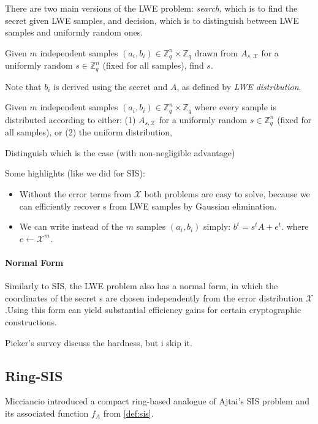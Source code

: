 There are two main versions of the LWE problem: \emph{search}, which is to find the secret given LWE samples,
and decision, which is to distinguish between LWE samples and uniformly random ones.

\label{def:LWE}
\begin{definition} 
    Given $m$ independent samples $(a_i,b_i) \in\mathbb{Z}_q^n \times \mathbb{Z}_q$ drawn from $A_{s,\mathcal{X}}$
for a uniformly random $s \in \mathbb{Z}^n_q$ (fixed for all samples), find $s$.
\end{definition}

Note that $b_i$ is derived using the secret and $A$, as defined by \emph{LWE distribution}.

\begin{definition} 
    Given $m$ independent samples $(a_i,b_i) \in\mathbb{Z}_q^n \times \mathbb{Z}_q$ where every sample is distributed according to either:  (1)
    $A_{s,\mathcal{X}}$ for a uniformly random $s \in \mathbb{Z}^n_q$ (fixed for all samples), or (2) the uniform distribution,
    
    Distinguish which is the case (with non-negligible advantage)
\end{definition}

Some highlights (like we did for SIS):
\begin{itemize}
    \item Without the error terms from $\mathcal{X}$ both problems are easy to solve, because we can efficiently recover s
from LWE samples by Gaussian elimination.
\item We can write instead of the $m$ samples $(a_i,b_i)$ simply: $b^t = s^t A +e^t$. where $e \leftarrow\mathcal{X}^m$.
\end{itemize}


\paragraph{\bf Normal Form} 
Similarly to SIS, the LWE problem also has a normal form, in which the coordinates
of the secret s are chosen independently from the error distribution $\mathcal{X}$.Using this form can
yield substantial efficiency gains for certain cryptographic constructions.

Pieker's survey discuss the hardness, but i skip it.


\subsection{Ring-SIS}
Micciancio introduced a compact ring-based analogue of Ajtai's SIS problem and its associated function $f_A$
from \autoref{def:sis}.

